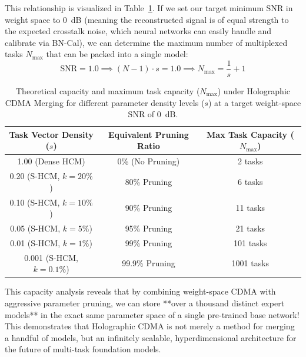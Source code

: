 \documentclass{article}
\begin{document}
This relationship is visualized in Table~\ref{tab:capacity}. If we set our target minimum SNR in weight space to $0$~dB (meaning the reconstructed signal is of equal strength to the expected crosstalk noise, which neural networks can easily handle and calibrate via BN-Cal), we can determine the maximum number of multiplexed tasks $N_{\text{max}}$ that can be packed into a single model:
\begin{equation}
    \text{SNR} = 1.0 \implies (N - 1) \cdot s = 1.0 \implies N_{\text{max}} = \frac{1}{s} + 1
\end{equation}

\begin{table}[htbp]
\caption{Theoretical capacity and maximum task capacity ($N_{\text{max}}$) under Holographic CDMA Merging for different parameter density levels ($s$) at a target weight-space SNR of $0$~dB.}
\label{tab:capacity}
\vskip 0.15in
\begin{center}
\begin{small}
\begin{sc}
\setlength{\tabcolsep}{6pt}
\begin{tabular}{ccc}
\toprule
Task Vector Density ($s$) & Equivalent Pruning Ratio & Max Task Capacity ($N_{\text{max}}$) \\
\midrule
1.00 (Dense HCM) & 0\% (No Pruning) & 2 tasks \\
0.20 (S-HCM, $k=20\%$) & 80\% Pruning & 6 tasks \\
0.10 (S-HCM, $k=10\%$) & 90\% Pruning & 11 tasks \\
0.05 (S-HCM, $k=5\%$) & 95\% Pruning & 21 tasks \\
0.01 (S-HCM, $k=1\%$) & 99\% Pruning & 101 tasks \\
0.001 (S-HCM, $k=0.1\%$) & 99.9\% Pruning & 1001 tasks \\
\bottomrule
\end{tabular}
\end{sc}
\end{small}
\end{center}
\vskip -0.1in
\end{table}

This capacity analysis reveals that by combining weight-space CDMA with aggressive parameter pruning, we can store **over a thousand distinct expert models** in the exact same parameter space of a single pre-trained base network! This demonstrates that Holographic CDMA is not merely a method for merging a handful of models, but an infinitely scalable, hyperdimensional architecture for the future of multi-task foundation models.
\end{document}
